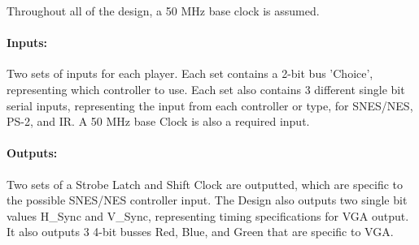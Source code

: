 \documentclass[]{article}
\begin{document}
Throughout all of the design, a 50 MHz base clock is assumed.
\paragraph{Inputs:} Two sets of inputs for each player. Each set contains a 2-bit bus 'Choice', 
representing which controller to use. Each set also contains 3 different single bit serial inputs,
representing the input from each controller or type, for SNES/NES, PS-2, and IR. A 50 MHz base Clock is also a required input.
\paragraph{Outputs:} Two sets of a Strobe Latch and Shift Clock are outputted, which are specific
 to the possible SNES/NES controller input. The Design also outputs two single bit values H\_Sync and V\_Sync, representing timing specifications for VGA output.
 It also outputs 3 4-bit busses Red, Blue, and Green that are specific to VGA.
\end{document}
